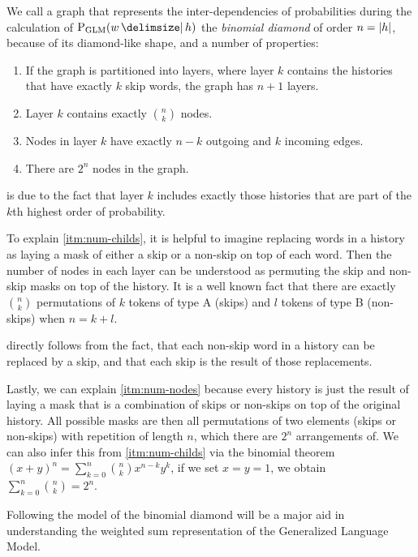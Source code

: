 We call a graph that represents the inter-dependencies of probabilities during
the calculation of $\ProbGLM{w}{h}$ the \emph{binomial diamond} of order
$n = {\left|h\right|}$, because of its diamond-like shape, and a number of
properties:

\begin{enumerate}
  \item \label{itm:num-layers} If the graph is partitioned into layers, where
    layer $k$ contains the histories that have exactly $k$ skip words, the graph
    has $n + 1$ layers.
  \item \label{itm:num-childs} Layer $k$ contains exactly $\binom{n}{k}$ nodes.
  \item \label{itm:num-edges}  Nodes in layer $k$ have exactly $n - k$ outgoing
    and $k$ incoming edges.
  \item \label{itm:num-nodes}  There are $2^n$ nodes in the graph.
\end{enumerate}

 is due to the fact that layer $k$ includes exactly those
histories that are part of the $k$th highest order of probability.

To explain \cref{itm:num-childs}, it is helpful to imagine replacing words in
a history as laying a mask of either a skip or a non-skip on top of each word.
Then the number of nodes in each layer can be understood as permuting the
skip and non-skip masks on top of the history.
It is a well known fact that there are exactly $\binom{n}{k}$ permutations of
$k$ tokens of type A (skips) and $l$ tokens of type B (non-skips) when
$n = k + l$.

 directly follows from the fact, that each non-skip word
in a history can be replaced by a skip, and that each skip is the result
of those replacements.

Lastly, we can explain \cref{itm:num-nodes} because every history is just the
result of laying a mask that is a combination of skips or non-skips on top of
the original history.
All possible masks are then all permutations of two elements (skips or
non-skips) with repetition of length $n$, which there are $2^n$ arrangements of.
We can also infer this from \cref{itm:num-childs} via the binomial theorem
$(x+ y)^n = \sum_{k=0}^n \binom{n}{k} x^{n-k} y^k$, if we set ${x = y = 1}$,
we obtain $\sum_{k=0}^n \binom{n}{k} = 2^n$.

Following the model of the binomial diamond will be a major aid in understanding
the weighted sum representation of the Generalized Language Model.


